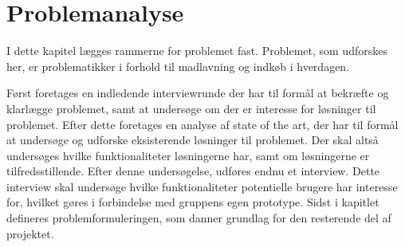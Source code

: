 \chapter{Problemanalyse}\label{chapter:problemanalyse}
I dette kapitel lægges rammerne for problemet fast.
Problemet, som udforskes her, er problematikker i forhold til madlavning og indkøb i hverdagen. 

Først foretages en indledende interviewrunde der har til formål at bekræfte og klarlægge problemet, samt at undersøge om der er interesse for løsninger til problemet.
Efter dette foretages en analyse af state of the art, der har til formål at undersøge og udforske eksisterende løsninger til problemet.
Der skal altså undersøges hvilke funktionaliteter løsningerne har, samt om løsningerne er tilfredsstillende.
Efter denne undersøgelse, udføres endnu et interview.
Dette interview skal undersøge hvilke funktionaliteter potentielle brugere har interesse for, hvilket gøres i forbindelse med gruppens egen prototype.
Sidst i kapitlet defineres problemformuleringen, som danner grundlag for den resterende del af projektet.






